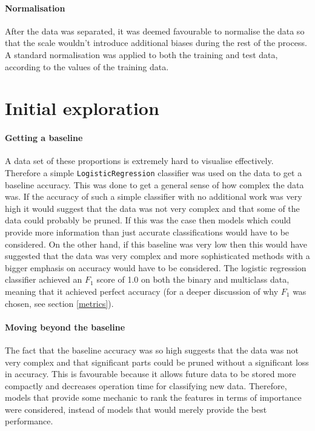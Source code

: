 \documentclass[british]{article}
\newcommand{\code}[1]{\texttt{#1}}
\begin{document}
	\paragraph{Normalisation} After the data was separated, it was deemed favourable to normalise the data so that the scale wouldn't introduce additional biases during the rest of the process. A standard normalisation was applied to both the training and test data, according to the values of the training data. 
	
	\section{Initial exploration}
	
	
	\paragraph{Getting a baseline}A data set of these proportions is extremely hard to visualise effectively. Therefore a simple \code{LogisticRegression} classifier was used on the data to get a baseline accuracy. This was done to get a general sense of how complex the data was. If the accuracy of such a simple classifier with no additional work was very high it would suggest that the data was not very complex and that some of the data could probably be pruned. If this was the case then models which could provide more information than just accurate classifications would have to be considered. On the other hand, if this baseline was very low then this would have suggested that the data was very complex and more sophisticated methods with a bigger emphasis on accuracy would have to be considered. The logistic regression classifier achieved an $F_1$ score of 1.0 on both the binary and multiclass data, meaning that it achieved perfect accuracy (for a deeper discussion of why $F_1$ was chosen, see section \ref{metrics}).
	
	
	\paragraph{Moving beyond the baseline} The fact that the baseline accuracy was so high suggests that the data was not very complex and that significant parts could be pruned without a significant loss in accuracy. This is favourable because it allows future data to be stored more compactly and decreases operation time for classifying new data. Therefore, models that provide some mechanic to rank the features in terms of importance were considered, instead of models that would merely provide the best performance. 
	
\end{document}
